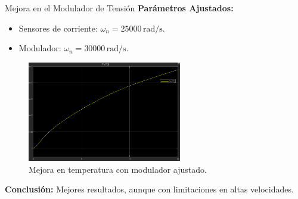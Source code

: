 \documentclass[12pt]{beamer}
\begin{document}
\begin{frame}{Mejora en el Modulador de Tensión}
\textbf{Parámetros Ajustados:}
\begin{itemize}
    \item Sensores de corriente: \( \omega_n = 25000 \, \text{rad/s} \).
    \item Modulador: \( \omega_n = 30000 \, \text{rad/s} \).
\end{itemize}

\begin{figure}[h]
    \centering
    \includegraphics[width=0.6\textwidth]{Imagenes/Temperatura_Estator_ModuladorTNImejorado.png}
    \caption{Mejora en temperatura con modulador ajustado.}
\end{figure}

\textbf{Conclusión:} Mejores resultados, aunque con limitaciones en altas velocidades.
\end{frame}
\end{document}
